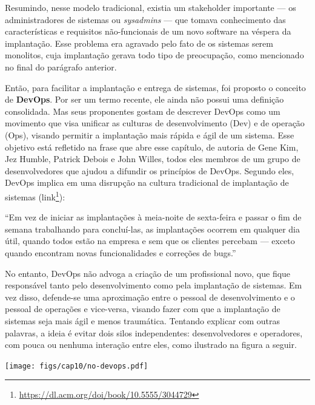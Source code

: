 \documentclass[
  11pt,
  twoside]{book}
\DeclareRobustCommand{\href}[2]{#2\footnote{\url{#1}}}
\renewenvironment{quote}{\centering \vspace{1.5ex} \begin{tcolorbox}[colback=backcolor, width=4.9in]}{\end{tcolorbox}}
\let\origfigure\figure
\let\endorigfigure\endfigure
\renewenvironment{figure}[1][2] {
    \expandafter\origfigure\expandafter[!h]
} {
    \endorigfigure
}
\begin{document}
 Resumindo, nesse modelo tradicional,
existia um stakeholder importante --- os administradores de sistemas ou
\emph{sysadmins} --- que tomava conhecimento das características e
requisitos não-funcionais de um novo software na véspera da implantação.
Esse problema era agravado pelo fato de os sistemas serem monolitos,
cuja implantação gerava todo tipo de preocupação, como mencionado no
final do parágrafo anterior.

Então, para facilitar a implantação e entrega de sistemas, foi proposto
o conceito de \textbf{DevOps}. Por ser um termo recente, ele ainda não
possui uma definição consolidada. Mas seus proponentes gostam de
descrever DevOps como um movimento que visa unificar as culturas de
desenvolvimento (Dev) e de operação (Ops), visando permitir a
implantação mais rápida e ágil de um sistema. Esse objetivo está
refletido na frase que abre esse capítulo, de autoria de Gene Kim, Jez
Humble, Patrick Debois e John Willes, todos eles membros de um grupo de
desenvolvedores que ajudou a difundir os princípios de DevOps. Segundo
eles, DevOps implica em uma disrupção na cultura tradicional de
implantação de sistemas
(\href{https://dl.acm.org/doi/book/10.5555/3044729}{link}):

\begin{quote}
``Em vez de iniciar as implantações à meia-noite de sexta-feira e passar
o fim de semana trabalhando para concluí-las, as implantações ocorrem em
qualquer dia útil, quando todos estão na empresa e sem que os clientes
percebam --- exceto quando encontram novas funcionalidades e correções
de bugs.''
\end{quote}

No entanto, DevOps não advoga a criação de um profissional novo, que
fique responsável tanto pelo desenvolvimento como pela implantação de
sistemas. Em vez disso, defende-se uma aproximação entre o pessoal de
desenvolvimento e o pessoal de operações e vice-versa, visando fazer com
que a implantação de sistemas seja mais ágil e menos traumática.
Tentando explicar com outras palavras, a ideia é evitar dois silos
independentes: desenvolvedores e operadores, com pouca ou nenhuma
interação entre eles, como ilustrado na figura a seguir.

\begin{figure}
\centering
\texttt{[image: figs/cap10/no-devops.pdf]}
\caption{Organização que \textbf{não} é baseada em DevOps, pois existe
pouca comunicação entre Dev e Ops.}
\end{figure}
\end{document}
